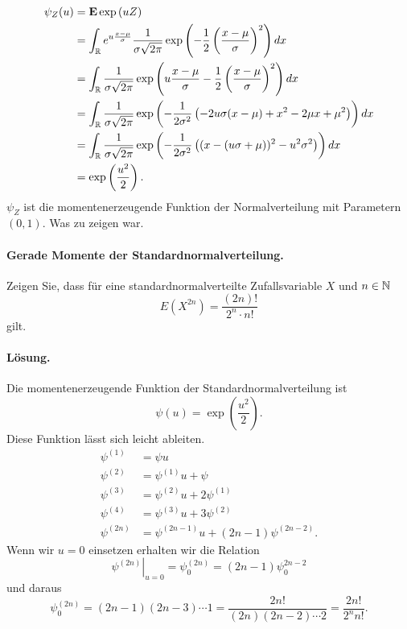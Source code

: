 \begin{align*}
    \psi_{Z}(u) &= \mathbf{E} \exp \left( u Z \right) \\
    &= \int_{\mathbb R} e^{u \frac{x-\mu}{\sigma}} \frac{1}{\sigma \sqrt{2\pi}}
    \exp \left( -\frac{1}{2} \left( \frac{x-\mu}{\sigma} \right)^2 \right) dx \\
    &= \int_{\mathbb R} \frac{1}{\sigma\sqrt{2\pi}} 
    \exp \left(  u \frac{x-\mu}{\sigma} -\frac{1}{2} \left( \frac{x-\mu}{\sigma} \right)^2 \right) dx \\
    &= \int_{\mathbb R} \frac{1}{\sigma\sqrt{2\pi}} 
    \exp \left( -\frac{1}{2\sigma^2} \left( 
    -2 u \sigma (x-\mu) + x^2 - 2 \mu x + \mu^2 
    \right) \right) dx \\
    &= \int_{\mathbb R} \frac{1}{\sigma\sqrt{2\pi}} 
    \exp \left( -\frac{1}{2\sigma^2} \left( 
    (x - (u\sigma+\mu))^2 - u^2 \sigma^2 \right) \right) dx \\
    &= \exp \left( \frac{u^2}{2} \right).
\end{align*}
$\psi_{Z}$ ist die momentenerzeugende Funktion der Normalverteilung mit 
Parametern $(0,1)$. Was zu zeigen war. 


\paragraph{Gerade Momente der Standardnormalverteilung. } Zeigen Sie, dass für eine
standardnormalverteilte Zufallsvariable $X$ und $n \in \mathbb N$
\begin{equation*}
    E\left( X^{2n} \right) = \frac{(2n)!}{2^n \cdot n!}
\end{equation*}
gilt. %
\paragraph*{Lösung.}
Die momentenerzeugende Funktion der Standardnormalverteilung ist 
\begin{equation*}
    \psi(u) = \exp \left( \frac{u^2}{2} \right).
\end{equation*}
Diese Funktion lässt sich leicht ableiten. 
\begin{align*}
    \psi^{(1)} &= \psi u \\
    \psi^{(2)} &= \psi^{(1)} u + \psi \\
    \psi^{(3)} &= \psi^{(2)} u + 2 \psi^{(1)} \\
    \psi^{(4)} &= \psi^{(3)} u + 3 \psi^{(2)} \\
    \psi^{(2n)} &= \psi^{(2n-1)} u + (2n-1) \psi^{(2n-2)}.
\end{align*}
Wenn wir $u=0$ einsetzen erhalten wir die Relation
\begin{equation*}
    \left. \psi^{(2n)} \right|_{u=0}^{} =
    \psi_{0}^{(2n)} = (2n-1)\psi^{2n-2}_{0}
\end{equation*}
und daraus
\begin{equation*}
    \psi_{0}^{(2n)} = (2n-1)(2n-3) \cdots 1 = \frac{ 2n!}{ (2n)(2n-2)\cdots 2  } = \frac{2n!}{ 2^n n!}.
\end{equation*}


